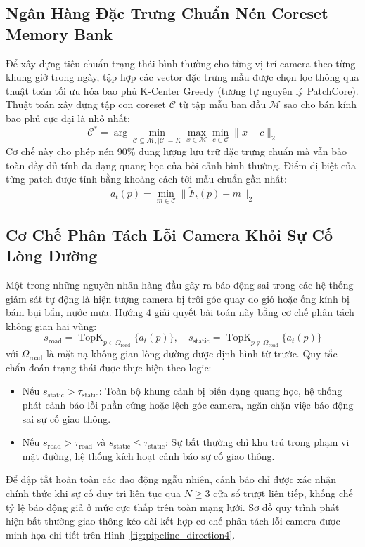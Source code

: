 \documentclass[11pt,a4paper]{article}
\begin{document}
\subsection{Ngân Hàng Đặc Trưng Chuẩn Nén Coreset Memory Bank}
Để xây dựng tiêu chuẩn trạng thái bình thường cho từng vị trí camera theo từng khung giờ trong ngày, tập hợp các vector đặc trưng mẫu được chọn lọc thông qua thuật toán tối ưu hóa bao phủ K-Center Greedy (tương tự nguyên lý PatchCore). Thuật toán xây dựng tập con coreset $\mathcal{C}$ từ tập mẫu ban đầu $\mathcal{M}$ sao cho bán kính bao phủ cực đại là nhỏ nhất:
\begin{equation}
    \mathcal{C}^* = \arg\min_{\mathcal{C} \subseteq \mathcal{M}, |\mathcal{C}| = K} \max_{x \in \mathcal{M}} \min_{c \in \mathcal{C}} \|x - c\|_2
\end{equation}
Cơ chế này cho phép nén 90\% dung lượng lưu trữ đặc trưng chuẩn mà vẫn bảo toàn đầy đủ tính đa dạng quang học của bối cảnh bình thường. Điểm dị biệt của từng patch được tính bằng khoảng cách tới mẫu chuẩn gần nhất:
\begin{equation}
    a_t(p) = \min_{m \in \mathcal{C}} \|\tilde{F}_t(p) - m\|_2
\end{equation}

\subsection{Cơ Chế Phân Tách Lỗi Camera Khỏi Sự Cố Lòng Đường}
Một trong những nguyên nhân hàng đầu gây ra báo động sai trong các hệ thống giám sát tự động là hiện tượng camera bị trôi góc quay do gió hoặc ống kính bị bám bụi bẩn, nước mưa. Hướng 4 giải quyết bài toán này bằng cơ chế phân tách không gian hai vùng:
\begin{equation}
    s_{\text{road}} = \operatorname{TopK}_{p \in \Omega_{\text{road}}}\{a_t(p)\}, \quad s_{\text{static}} = \operatorname{TopK}_{p \notin \Omega_{\text{road}}}\{a_t(p)\}
\end{equation}
với $\Omega_{\text{road}}$ là mặt nạ không gian lòng đường được định hình từ trước. Quy tắc chẩn đoán trạng thái được thực hiện theo logic:
\begin{itemize}
    \item Nếu $s_{\text{static}} > \tau_{\text{static}}$: Toàn bộ khung cảnh bị biến dạng quang học, hệ thống phát cảnh báo lỗi phần cứng hoặc lệch góc camera, ngăn chặn việc báo động sai sự cố giao thông.
    \item Nếu $s_{\text{road}} > \tau_{\text{road}}$ và $s_{\text{static}} \le \tau_{\text{static}}$: Sự bất thường chỉ khu trú trong phạm vi mặt đường, hệ thống kích hoạt cảnh báo sự cố giao thông.
\end{itemize}
Để dập tắt hoàn toàn các dao động ngẫu nhiên, cảnh báo chỉ được xác nhận chính thức khi sự cố duy trì liên tục qua $N \ge 3$ cửa sổ trượt liên tiếp, khống chế tỷ lệ báo động giả ở mức cực thấp trên toàn mạng lưới. Sơ đồ quy trình phát hiện bất thường giao thông kéo dài kết hợp cơ chế phân tách lỗi camera được minh họa chi tiết trên Hình~\ref{fig:pipeline_direction4}.
\end{document}
